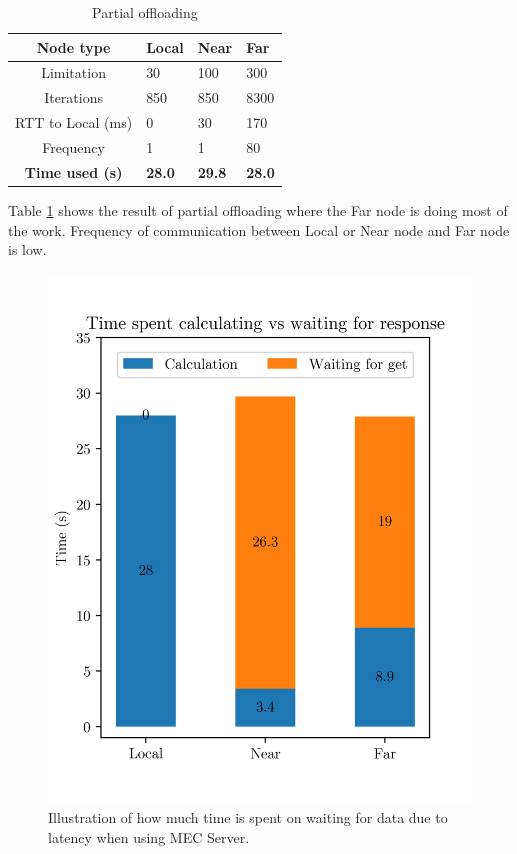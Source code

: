 \begin{table}[h!]
    \centering
    \begin{tabular}[c]{|c||p{2cm}|p{2cm}|p{2cm}|}
        \hline
        Node type & Local & Near & Far \\
        \hline
        Limitation          & 30 & 100 & 300  \\
        \hline
        Iterations          & 850 & 850 & 8300  \\
        \hline
        RTT to Local (ms)   & 0 & 30 & 170 \\
        \hline
        Frequency           & 1 & 1 & 80 \\
        \hline
        \hline
        \hline
        \textbf{Time used (s)}       & \textbf{28.0} & \textbf{29.8} & \textbf{28.0} \\
        \hline
    \end{tabular}
    \caption{Partial offloading}
    \label{tab:MEC_partial_offloading_low_frequency}
\end{table}

Table \ref{tab:MEC_partial_offloading_low_frequency} shows the result of partial offloading where the Far node is doing most of the work. Frequency of communication between Local or Near node and Far node is low. 


\begin{figure}[t]
    \centering
    \includegraphics[scale=1]{chapters/6_evaluation/figures/MEC_Partial_bar.png}
    \caption{Illustration of how much time is spent on waiting for data due to latency when using MEC Server.}
    \label{fig:MEC_partial_bar}
\end{figure}

